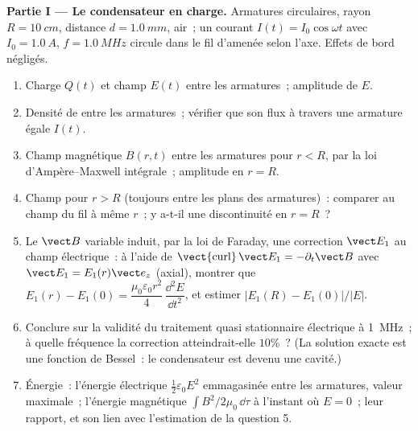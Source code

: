 \begin{problem}
\label{pb:b2:maxwell-equations:1}

\medskip
\noindent\textbf{Partie I --- Le condensateur en charge.}
Armatures circulaires, rayon $R = \qty{10}{cm}$, distance $d = \qty{1.0}{mm}$,
air~; un courant $I(t) = I_0\cos\omega t$ avec $I_0 = \qty{1.0}{A}$, $f = \qty{1.0}{MHz}$
circule dans le fil d'amenée selon l'axe. Effets de bord négligés.
\begin{enumerate}
  \item Charge $Q(t)$ et champ $E(t)$ entre les armatures~; amplitude de
        $E$.
  \item Densité de  entre les armatures~; vérifier que
        son flux à travers une armature égale $I(t)$.
  \item Champ magnétique $B(r, t)$ entre les armatures pour $r < R$, par la
        loi d'Ampère--Maxwell intégrale~; amplitude en $r = R$.
  \item Champ pour $r > R$ (toujours entre les plans des armatures)~:
        comparer au champ du fil à même $r$~; y a-t-il une
        discontinuité en $r = R$~?
  \item Le $\vect B$ variable induit, par la loi de Faraday, une correction
        $\vect E_1$ au champ électrique~: à l'aide de $\operatorname{\vect{curl}}\vect E_1
        = -\partial_t\vect B$ avec $\vect E_1 = E_1(r)\vect e_z$ (axial), montrer que
        $E_1(r) - E_1(0) = \dfrac{\mu_0\varepsilon_0r^2}4\,\dfrac{\dd^2E}{\dd t^2}$, et
        estimer $|E_1(R) - E_1(0)|/|E|$.
  \item Conclure sur la validité du traitement quasi stationnaire
        électrique à \qty{1}{MHz}~; à quelle fréquence la correction
        atteindrait-elle $10\%$~? (La solution exacte est une fonction de Bessel~: le
        condensateur est devenu une cavité.)
  \item Énergie~: l'énergie électrique $\tfrac12\varepsilon_0E^2$ emmagasinée entre les
        armatures, valeur maximale~; l'énergie magnétique $\int B^2/2\mu_0\,\dd\tau$
        à l'instant où $E = 0$~; leur rapport, et son lien avec
        l'estimation de la question 5.
\end{enumerate}


\end{problem}
